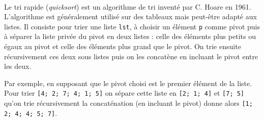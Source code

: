 \documentclass[11pt,a4paper]{article}
\begin{document}
\begin{Exercise*}[title = {type B}]\\
	Le tri rapide (\textit{quicksort}) est un algorithme de tri inventé par C. Hoare en 1961. L'algorithme est généralement utilisé sur des tableaux mais peut-être adapté aux listes. Il consiste pour trier une liste {\tt lst}, à choisir un élément {\tt p} comme pivot puis à séparer la liste privée du pivot en deux listes : celle des éléments plus petits ou égaux au pivot et celle des éléments plus grand que le pivot. On trie ensuite récursivement ces deux sous listes puis on les concatène en incluant le pivot entre les deux.

	Par exemple, en supposant que le pivot choisi est le premier élément de la liste. Pour trier {\tt [4; 2; 7; 4; 1; 5]} on sépare cette liste en  {\tt [2; 1; 4]} et {\tt [7; 5]} qu'on trie récursivement la concaténation (en incluant le pivot) donne alors {\tt [1; 2; 4; 4; 5; 7]}.

\end{Exercise*}
\end{document}
